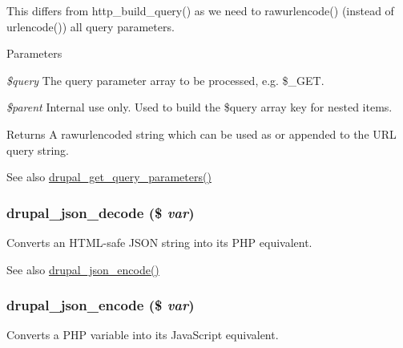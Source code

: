 This differs from http\_\-build\_\-query() as we need to rawurlencode() (instead of urlencode()) all query parameters.


\begin{DoxyParams}{Parameters}
\item[{\em \$query}]The query parameter array to be processed, e.g. \$\_\-GET. \item[{\em \$parent}]Internal use only. Used to build the \$query array key for nested items.\end{DoxyParams}
\begin{DoxyReturn}{Returns}
A rawurlencoded string which can be used as or appended to the URL query string.
\end{DoxyReturn}
\begin{DoxySeeAlso}{See also}
\hyperlink{group__http__handling_ga2e632373cf469e513c0b6b7095f0e4dd}{drupal\_\-get\_\-query\_\-parameters()} 
\end{DoxySeeAlso}
\hypertarget{group__php__wrappers_gae065f2a8115ef999b74d765c8e7f35ff}{
\subsubsection[{drupal\_\-json\_\-decode}]{\setlength{\rightskip}{0pt plus 5cm}drupal\_\-json\_\-decode (\$ {\em var})}}
\label{group__php__wrappers_gae065f2a8115ef999b74d765c8e7f35ff}
Converts an HTML-\/safe JSON string into its PHP equivalent.

\begin{DoxySeeAlso}{See also}
\hyperlink{group__php__wrappers_gaf09c80fb758b9f3657772e26817e37b9}{drupal\_\-json\_\-encode()} 
\end{DoxySeeAlso}
\hypertarget{group__php__wrappers_gaf09c80fb758b9f3657772e26817e37b9}{
\subsubsection[{drupal\_\-json\_\-encode}]{\setlength{\rightskip}{0pt plus 5cm}drupal\_\-json\_\-encode (\$ {\em var})}}
\label{group__php__wrappers_gaf09c80fb758b9f3657772e26817e37b9}
Converts a PHP variable into its JavaScript equivalent.

